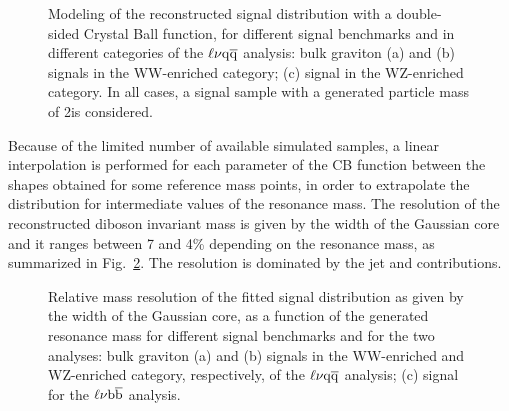 \begin{figure}[!htb]
\centering
{}
\caption{Modeling of the reconstructed signal distribution with a double-sided Crystal Ball function, for different signal benchmarks and in different \mJ categories of the $\ell\nu\mathrm{q}\overline{\mathrm{q}}$ analysis: 
bulk graviton (a) and \Zpr (b) signals in the WW-enriched category; (c) \Wpr signal in the WZ-enriched category. In all cases, a signal sample with a generated particle mass of 2\TeV is considered.}
\label{fig:mWVfit-signal-13TeV}
\end{figure}

Because of the limited number of available simulated samples, a linear interpolation is performed for each parameter of the CB function between
the shapes obtained for some reference mass points, in order to extrapolate the distribution for intermediate values of the resonance mass.
The resolution of the reconstructed diboson invariant mass is given by the width of the Gaussian core and it ranges between 7 and 4\% depending on the resonance mass, as summarized in Fig.~\ref{fig:relCB}.
The resolution is dominated by the jet and \ETmiss contributions.

\begin{figure}[!htb]
\centering
{}
\caption{Relative mass resolution of the fitted signal distribution as given by the width of the Gaussian core, as a function of the generated resonance mass for different signal benchmarks and for the two analyses:
bulk graviton (a) and \Wpr (b) signals in the WW-enriched and WZ-enriched category, respectively, of the $\ell\nu\mathrm{q}\overline{\mathrm{q}}$ analysis; (c) \Wpr signal for the $\ell\nu{\mathrm{b}\overline{\mathrm{b}}}$ analysis.}
\label{fig:relCB}
\end{figure}

